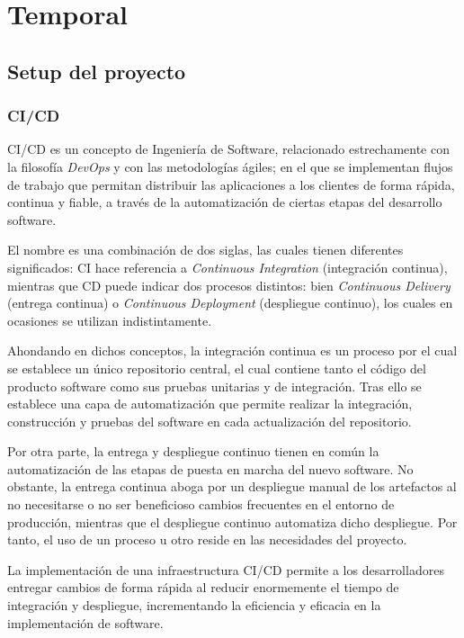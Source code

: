 \chapter{Temporal}
    \section{Setup del proyecto}
    \subsection{CI/CD}
        
        CI/CD es un concepto de Ingeniería de Software, relacionado estrechamente con la filosofía \textit{DevOps} y con las metodologías ágiles; en el que se implementan flujos de trabajo que permitan distribuir las aplicaciones a los clientes de forma rápida, continua y fiable, a través de la automatización de ciertas etapas del desarrollo software.
        
        El nombre es una combinación de dos siglas, las cuales tienen diferentes significados: CI hace referencia a \textit{Continuous Integration} (integración continua), mientras que CD puede indicar dos procesos distintos: bien \textit{Continuous Delivery} (entrega continua) o \textit{Continuous Deployment} (despliegue continuo), los cuales en ocasiones se utilizan indistintamente.
        
        Ahondando en dichos conceptos, la integración continua es un proceso por el cual se
        establece un único repositorio central, el cual contiene tanto el código del producto software como sus pruebas unitarias y de integración. Tras ello se establece una capa de automatización que permite realizar la integración, construcción y pruebas del software en cada actualización del repositorio. 
        
        Por otra parte, la entrega y despliegue continuo tienen en común la automatización de las etapas de puesta en marcha del nuevo software. No obstante, la entrega continua aboga por un despliegue manual de los artefactos al no necesitarse o no ser beneficioso cambios frecuentes en el entorno de producción, mientras que el despliegue continuo automatiza dicho despliegue. Por tanto, el uso de un proceso u otro reside en las necesidades del proyecto.
        
        La implementación de una infraestructura CI/CD permite a los desarrolladores entregar cambios de forma rápida al reducir enormemente el tiempo de integración y despliegue, incrementando la eficiencia y eficacia en la implementación de software. 
        
